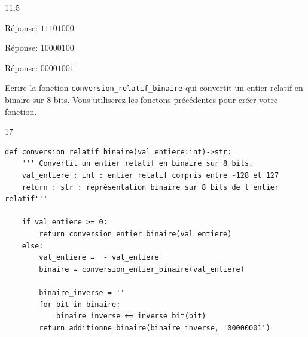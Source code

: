 \documentclass[a4paper,10pt]{report}
\def\ptsexoC{2}
\begin{document}
\begin{enumerate}
    \begin{answer}{1}{1.5}
    
        \begin{minipage}[t]{0.33\linewidth}

            Réponse: $11101000$
        \end{minipage}
        \begin{minipage}[t]{0.33\linewidth}

            Réponse: $10000100$
        \end{minipage}
        \begin{minipage}[t]{0.33\linewidth}

            Réponse: $00001001$
        \end{minipage}
    
    \end{answer}

\end{enumerate}

\newpage

\thispagestyle{DS_LP}
\exods{\ptsexoC}

Ecrire la fonction \texttt{conversion\_relatif\_binaire} qui convertit un entier relatif en binaire sur 8 bits. Vous utiliserez les fonctons précédentes pour créer votre fonction. 
    
    \begin{answer}{1}{7}
    \begin{verbatim}
def conversion_relatif_binaire(val_entiere:int)->str:
    ''' Convertit un entier relatif en binaire sur 8 bits. 
    val_entiere : int : entier relatif compris entre -128 et 127
    return : str : représentation binaire sur 8 bits de l'entier relatif'''

    if val_entiere >= 0:
        return conversion_entier_binaire(val_entiere)
    else:
        val_entiere =  - val_entiere
        binaire = conversion_entier_binaire(val_entiere)

        binaire_inverse = ''
        for bit in binaire:
            binaire_inverse += inverse_bit(bit)
        return additionne_binaire(binaire_inverse, '00000001')

\end{verbatim}
    \end{answer}
\end{document}
